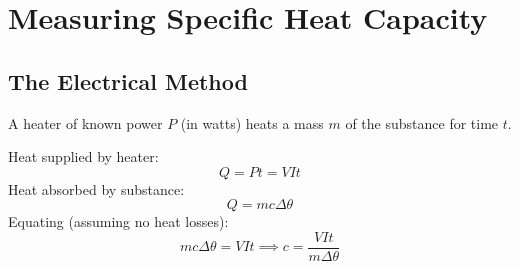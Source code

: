 \section{Measuring Specific Heat Capacity}

\subsection{The Electrical Method}

\begin{processbox}
A heater of known power $P$ (in watts) heats a
mass $m$ of the substance for time $t$.

Heat supplied by heater:
\[
  Q = Pt = VIt
\]
Heat absorbed by substance:
\[
  Q = mc\Delta\theta
\]
Equating (assuming no heat losses):
\[
  mc\Delta\theta = VIt
  \implies c = \frac{VIt}{m\Delta\theta}
\]
\end{processbox}

